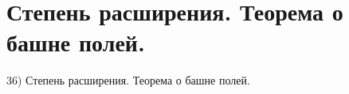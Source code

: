 \section{
 Степень расширения. Теорема о башне полей.
}

36) Степень расширения. Теорема о башне полей.
